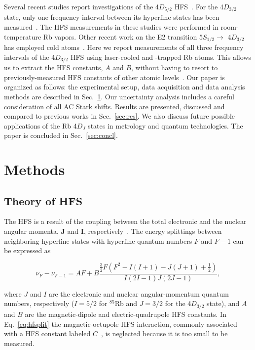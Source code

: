 \documentclass[reprint, amsmath,amssymb, aps, pra, longbibliography]{revtex4-1}
\begin{document}
Several recent studies report investigations of the 4$D_{5/2}$ HFS~\cite{Lee_07, wang2014, lee2015, Roy17}. For the 4$D_{3/2}$ state, only one frequency interval between its hyperfine states has been measured~\cite{liao1974, moon2009}. The HFS measurements in these studies were performed in room-temperature Rb vapors. Other recent work on the E2 transition $5S_{1/2} \rightarrow$ $4D_{3/2}$ has employed cold atoms~\cite{Ray_2020}. Here we report measurements of all three frequency intervals of the 4$D_{3/2}$ HFS using laser-cooled and -trapped Rb atoms. This allows us to extract the HFS constants, $A$ and $B$, without having to resort to previously-measured HFS constants of other atomic levels~\cite{liao1974, moon2009}. Our paper is organized as follows: the experimental setup, data acquisition and data analysis methods are described in Sec.~\ref{sec:methods}. Our uncertainty analysis includes a careful consideration of all AC Stark shifts. Results are presented, discussed and compared to previous works in Sec.~\ref{sec:res}. We also discuss future possible applications of the Rb 4$D_J$ states in metrology and quantum technologies. The paper is concluded in Sec.~\ref{sec:concl}. 


\section{Methods}
\label{sec:methods}

\subsection{Theory of HFS}
\label{subsec:theory}
The HFS is a result of the coupling between the total electronic and the nuclear angular momenta, $\textbf{J}$ and $\textbf{I}$, respectively~\cite{footbook}. The energy splittings between neighboring hyperfine states with hyperfine quantum numbers $F$ and $F-1$ can be expressed as

\begin{equation}
\nu_{F}- \nu_{F-1} = A F + B \frac{\frac{3}{2} F (F^2 - I(I+1) - J(J+1) + \frac{1}{2})}{I (2I-1) J (2J - 1)},
\label{eq:hfsplit}
\end{equation}

\noindent where $J$ and $I$ are the electronic and nuclear angular-momentum quantum numbers, respectively ($I = 5/2$ for $^{85}$Rb and $J = 3/2$ for the 4$D_{3/2}$ state), and $A$ and $B$ are the magnetic-dipole and electric-quadrupole HFS constants. In Eq.~\ref{eq:hfsplit} the magnetic-octupole HFS interaction, commonly associated with a HFS constant labeled $C$~\cite{SteckRb85}, is neglected because it is too small to be measured.   
\end{document}
